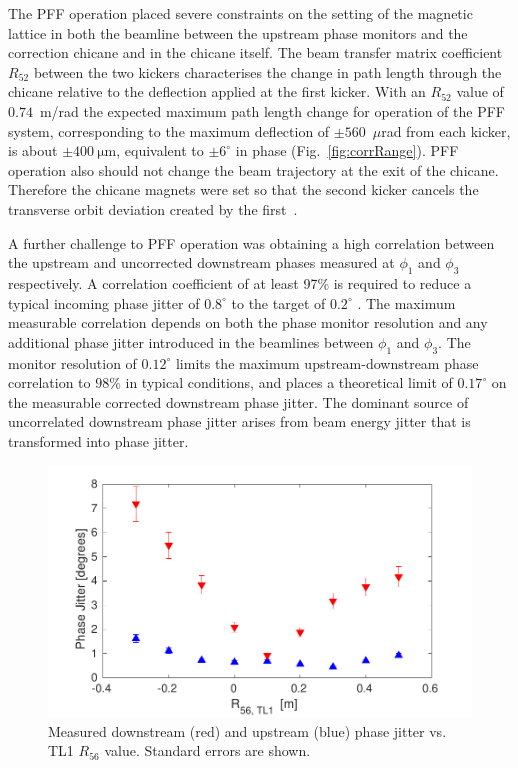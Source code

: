 \documentclass[%
 reprint,
 superscriptaddress,
 amsmath,
 amssymb,
 prl,
]{revtex4-1}
\begin{document}
The PFF operation placed severe constraints on the setting of the 
magnetic lattice in both the beamline between the upstream phase monitors and 
the correction chicane and in  the chicane itself.
The beam transfer matrix coefficient \(R_{52}\) between the two kickers 
characterises the change in path length through the chicane relative to the 
deflection applied at the first kicker. 
With an \(R_{52}\) value of \(0.74\)~m/rad \cite{RobertsThesis} the expected 
maximum path length change for operation of the PFF system, corresponding to 
the maximum deflection of \(\pm560\)~\(\mu\)rad from each kicker, is about 
\(\pm400~\mathrm{\mu m}\), equivalent to \(\pm6^\circ\) in phase 
(Fig.~\ref{fig:corrRange}). PFF operation also should not change the beam 
trajectory at the exit of the chicane. Therefore the chicane magnets were set 
so that the second kicker cancels the transverse orbit deviation created by the 
first~\cite{RobertsThesis}.

A further challenge to PFF operation was obtaining a high correlation 
between the upstream and uncorrected downstream phases measured at \(\phi_1\) 
and \(\phi_3\) respectively. 
A correlation coefficient of at least 97\% is required to reduce a typical 
incoming phase jitter of \(0.8^\circ\) to the target of \(0.2^\circ\) 
\cite{RobertsThesis}. 
The maximum measurable correlation depends on both the phase monitor resolution 
and any additional phase jitter introduced in the beamlines between \(\phi_1\) 
and \(\phi_3\). The monitor resolution of \(0.12^\circ\) limits the maximum 
upstream-downstream phase correlation to \(98\%\) in typical conditions, and 
places a theoretical limit of \(0.17^\circ\) on the measurable corrected 
downstream phase jitter. 
The dominant source of uncorrelated downstream phase jitter arises from  
beam energy jitter that is transformed into phase jitter. 

\begin{figure}
	\includegraphics[width=\columnwidth]{figs/r56Scan}
	\caption{\label{fig:r56Scan}Measured downstream (red) and upstream (blue) 
	phase jitter vs. TL1 \(R_{56}\) value. Standard errors are shown.
		}
\end{figure}
\end{document}
